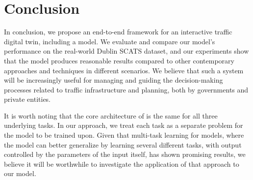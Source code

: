 \section{Conclusion}\label{sec:conclusion}
In conclusion, we propose an end-to-end framework for an interactive traffic digital twin, including a model. We evaluate and compare our model's performance on the real-world Dublin SCATS dataset, and our experiments show that the model produces reasonable results compared to other contemporary approaches and techniques in different scenarios. We believe that such a system will be increasingly useful for managing and guiding the decision-making processes related to traffic infrastructure and planning, both by governments and private entities.

It is worth noting that the core architecture of \name is the same for all three underlying tasks. In our approach, we treat each task as a separate problem for the model to be trained upon. Given that multi-task learning for models, where the model can better generalize by learning several different tasks, with output controlled by the parameters of the input itself, has shown promising results, we believe it will be worthwhile to investigate the application of that approach to our model.
